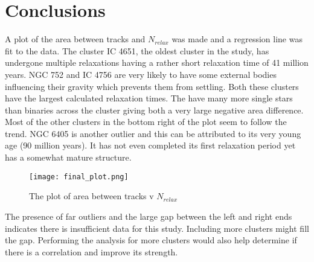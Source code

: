 \chapter{Conclusions}\label{ch:ch4}

A plot of the area between tracks and $N_{relax}$ was made and a regression line was fit to the data. The cluster IC 4651, the oldest cluster in the study, has undergone multiple relaxations having a rather short relaxation time of 41 million years. NGC 752 and IC 4756 are very likely to have some external bodies influencing their gravity which prevents them from settling. Both these clusters have the largest calculated relaxation times. The have many more single stars than binaries across the cluster giving both a very large negative area difference. Most of the other clusters in the bottom right of the plot seem to follow the trend. NGC 6405 is another outlier and this can be attributed to its very young age (90 million years). It has not even completed its first relaxation period yet has a somewhat mature structure. 

\begin{figure}[h]
	\centering
	\texttt{[image: final\_plot.png]}
	\caption{The plot of area between tracks v $N_{relax}$}
	\label{fig:im8}
\end{figure}

The presence of far outliers and the large gap between the left and right ends indicates there is insufficient data for this study. Including more clusters might fill the gap. Performing the analysis for more clusters would also help determine if there is a correlation and improve its strength.
